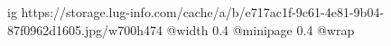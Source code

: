  
 
 
 
 

\ifcmt
  ig https://storage.lug-info.com/cache/a/b/e717ac1f-9c61-4e81-9b04-87f0962d1605.jpg/w700h474
  @width 0.4
  @minipage 0.4
  @wrap \parpic[r]
\fi
